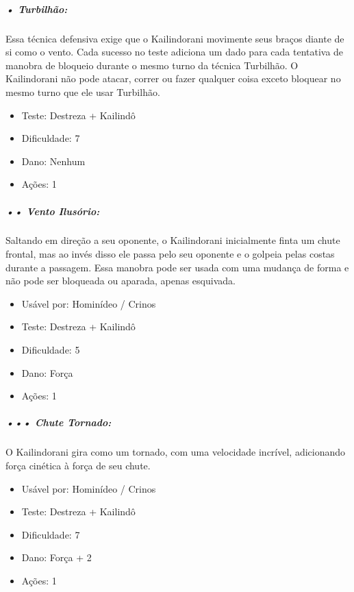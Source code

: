 \subparagraph{\bf • Turbilhão:}
Essa técnica defensiva exige que o Kailindorani movimente seus braços diante de si como o vento. Cada sucesso no teste adiciona um dado para cada tentativa de manobra de bloqueio durante o mesmo turno da técnica Turbilhão. O Kailindorani não pode atacar, correr ou fazer qualquer coisa exceto bloquear no mesmo turno que ele usar Turbilhão.
\begin{itemize}[noitemsep]
\item Teste: Destreza + Kailindô 
\item Dificuldade: 7
\item Dano: Nenhum 
\item Ações: 1
\end{itemize}

\subparagraph{\bf •• Vento Ilusório:}
Saltando em direção a seu oponente, o Kailindorani inicialmente finta um chute frontal, mas ao invés disso ele passa pelo seu oponente e o golpeia pelas costas durante a passagem. Essa manobra pode ser usada com uma mudança de forma e não pode ser bloqueada ou aparada, apenas esquivada. 
\begin{itemize}[noitemsep]
\item Usável por: Hominídeo / Crinos
\item Teste: Destreza + Kailindô
\item Dificuldade: 5
\item Dano: Força 
\item Ações: 1
\end{itemize}

\subparagraph{\bf ••• Chute Tornado:}
O Kailindorani gira como um tornado, com uma velocidade incrível, adicionando força cinética à força de seu chute.
\begin{itemize}[noitemsep]
\item Usável por: Hominídeo / Crinos
\item Teste: Destreza + Kailindô 
\item Dificuldade: 7
\item Dano: Força + 2 
\item Ações: 1
\end{itemize}

